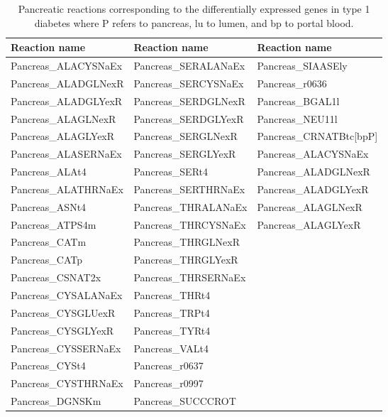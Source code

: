\clearpage

\begin{table}[h]
\caption[Pancreatic reactions corresponding to the differentially expressed genes in type 1 diabetes.]{Pancreatic reactions corresponding to the differentially expressed genes in type 1 diabetes where P refers to pancreas, lu to lumen, and bp to portal blood.}
\begin{center}
	\begin{tabular*}{\textwidth}{l @{\extracolsep{\fill}} ll}
	\hline
	Reaction name      & Reaction name  & Reaction name\\ 
	\hline
Pancreas\_ALACYSNaEx  & Pancreas\_SERALANaEx & Pancreas\_SIAASEly \\    	
Pancreas\_ALADGLNexR  & Pancreas\_SERCYSNaEx & Pancreas\_r0636 \\  	
Pancreas\_ALADGLYexR  & Pancreas\_SERDGLNexR & Pancreas\_BGAL1l \\   	
Pancreas\_ALAGLNexR   & Pancreas\_SERDGLYexR & Pancreas\_NEU11l \\   	
Pancreas\_ALAGLYexR   & Pancreas\_SERGLNexR  & Pancreas\_CRNATBtc[bpP] \\   	
Pancreas\_ALASERNaEx  & Pancreas\_SERGLYexR  & Pancreas\_ALACYSNaEx \\   	
Pancreas\_ALAt4       & Pancreas\_SERt4      & Pancreas\_ALADGLNexR \\   	
Pancreas\_ALATHRNaEx  & Pancreas\_SERTHRNaEx & Pancreas\_ALADGLYexR \\  	
Pancreas\_ASNt4       & Pancreas\_THRALANaEx & Pancreas\_ALAGLNexR\\   	
Pancreas\_ATPS4m      & Pancreas\_THRCYSNaEx & Pancreas\_ALAGLYexR \\   	
Pancreas\_CATm        & Pancreas\_THRGLNexR  \\   	
Pancreas\_CATp        & Pancreas\_THRGLYexR \\   	
Pancreas\_CSNAT2x     & Pancreas\_THRSERNaEx \\   	
Pancreas\_CYSALANaEx  & Pancreas\_THRt4 \\   	
Pancreas\_CYSGLUexR   & Pancreas\_TRPt4 \\   	
Pancreas\_CYSGLYexR   & Pancreas\_TYRt4 \\   	
Pancreas\_CYSSERNaEx  & Pancreas\_VALt4 \\   	
Pancreas\_CYSt4       & Pancreas\_r0637 \\   	
Pancreas\_CYSTHRNaEx  & Pancreas\_r0997 \\   	
Pancreas\_DGNSKm      & Pancreas\_SUCCCROT \\   	

\end{tabular*}
\end{center}
\end{table}
